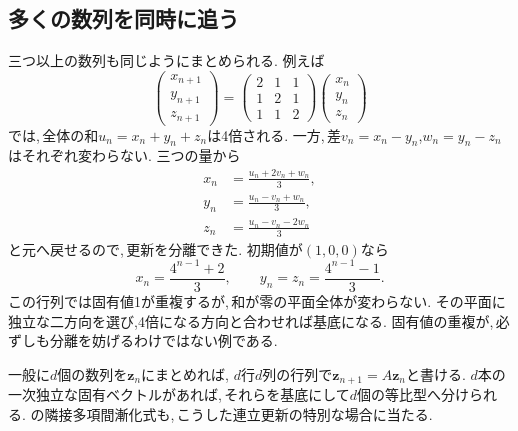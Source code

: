\subsection{多くの数列を同時に追う}

三つ以上の数列も同じようにまとめられる.
例えば
\[
 \begin{pmatrix}x_{n+1}\\y_{n+1}\\z_{n+1}\end{pmatrix}
 =
 \begin{pmatrix}2&1&1\\1&2&1\\1&1&2\end{pmatrix}
 \begin{pmatrix}x_n\\y_n\\z_n\end{pmatrix}
\]
では,\,全体の和$u_n=x_n+y_n+z_n$は4倍される.
一方,\,差$v_n=x_n-y_n$,$w_n=y_n-z_n$はそれぞれ変わらない.
三つの量から
\[
 \begin{aligned}
 x_n&=\frac{u_n+2v_n+w_n}{3},\\
 y_n&=\frac{u_n-v_n+w_n}{3},\\
 z_n&=\frac{u_n-v_n-2w_n}{3}
 \end{aligned}
\]
と元へ戻せるので,\,更新を分離できた.
初期値が$(1,0,0)$なら
\[
 x_n=\frac{4^{n-1}+2}{3},\qquad
 y_n=z_n=\frac{4^{n-1}-1}{3}.
\]
この行列では固有値1が重複するが,\,和が零の平面全体が変わらない.
その平面に独立な二方向を選び,4倍になる方向と合わせれば基底になる.
固有値の重複が,\,必ずしも分離を妨げるわけではない例である.

一般に$d$個の数列を$\boldsymbol z_n$にまとめれば,
$d$行$d$列の行列で$\boldsymbol z_{n+1}=A\boldsymbol z_n$と書ける.
$d$本の一次独立な固有ベクトルがあれば,\,それらを基底にして$d$個の等比型へ分けられる.
の隣接多項間漸化式も,\,こうした連立更新の特別な場合に当たる.
